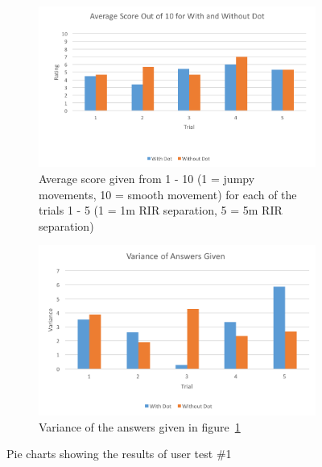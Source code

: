 \documentclass[../../main.tex]{subfiles}
\begin{document}
				\begin{figure}[H]
					\begin{subfigure}{1\textwidth}
						\centerline{\includegraphics[scale = 0.7]{Sections/userTesting/images/test3/Q3Score.png}}
						\caption{Average score given from 1 - 10 (1 = jumpy movements, 10 = smooth movement) for each of the trials 1 - 5 (1 = 1m \ac{RIR} separation, 5 = 5m \ac{RIR} separation)}
						\label{score}
					\end{subfigure}
					
					\begin{subfigure}{1\textwidth}
						\centerline{\includegraphics[scale = 0.7]{Sections/userTesting/images/test3/Q3Variance.png}}
						\caption{Variance of the answers given in figure~\ref{score}}
						\label{variance}
					\end{subfigure}
					\caption{Pie charts showing the results of user test \#1}
					\label{test1Results}
				\end{figure}
\end{document}
